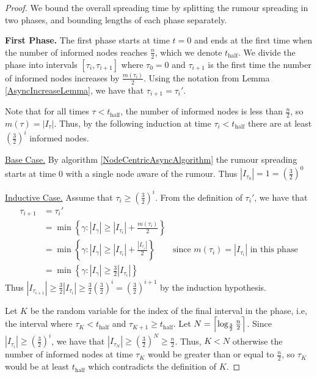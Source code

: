 \begin{proof}
	We bound the overall spreading time by splitting the rumour spreading in two phases, and bounding lengths of each phase separately.

	\textbf{First Phase.} The first phase starts at time $t=0$ and ends at the first time when the number of informed nodes reaches $\frac{n}{2}$, which we denote $t_\text{half}$. We divide the phase into intervals $[\tau_i, \tau_{i+1}]$ where $\tau_0 = 0$ and $\tau_{i+1}$ is the first time the number of informed nodes increases by $\frac{m(\tau_i)}{2}$. 
	Using the notation from Lemma \ref{AsyncIncreaseLemma}, we have that $\tau_{i+1} = \tau_i'$. 
	
	Note that for all times $\tau < t_\text{half}$, the number of informed nodes is less than $\frac{n}{2}$, so $m(\tau) = |I_\tau|$. Thus, by the following induction at time $\tau_i < t_\text{half}$ there are at least $(\frac{3}{2})^i$ informed nodes.

	\underline{Base Case.}
	By algorithm \ref{NodeCentricAsyncAlgorithm} the rumour spreading starts at time 0 with a single node aware of the rumour. Thus $|I_{\tau_0}| = 1 = (\frac{3}{2})^0$

	\underline{Inductive Case.} 
	Assume that $\tau_i \geq (\frac{3}{2})^i$.
	From the definition of $\tau_i'$, we have that 
	\begin{align*}
		\tau_{i+1} &= \tau_i' \\
		&= \min\left\{\gamma : |I_{\gamma}| \geq |I_{\tau_i}| + \frac{m(\tau_i)}{2}\right\} \\
		&= \min\left\{\gamma : |I_{\gamma}| \geq |I_{\tau_i}| + \frac{|I_{\tau_i}|}{2}\right\} & \text{since } m(\tau_i) = |I_{\tau _i}| \text{ in this phase} \\ 
		&= \min\left\{\gamma : |I_{\gamma}| \geq \frac{3}{2}|I_{\tau_i}|\right\} 
	\end{align*}
	Thus $|I_{\tau_{i+1}}| \geq \frac{3}{2}|I_{\tau_i}| \geq \frac{3}{2}(\frac{3}{2})^i = (\frac{3}{2})^{i+1}$ by the induction hypothesis. 
	
	Let $K$ be the random variable for the index of the final interval in the phase, i.e, the interval where $\tau_K < t_\text{half}$ and $\tau_{K+1} \geq t_\text{half}$.
	Let $N = \ceil*{\log_\frac{3}{2}\frac{n}{2}}$.  Since $|I_{\tau_i}| \geq (\frac{3}{2})^i$, we have that $|I_{\tau_N}| \geq (\frac{3}{2})^N \geq \frac{n}{2}$. Thus, $K < N$ otherwise the number of informed nodes at time $\tau_K$ would be greater than or equal to $\frac{n}{2}$, so $\tau_K$ would be at least $t_\text{half}$ which contradicts the definition of $K$.


\end{proof}
